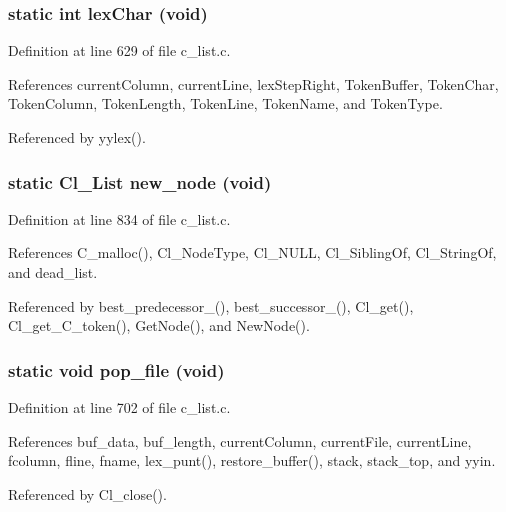 \subsubsection{\setlength{\rightskip}{0pt plus 5cm}static int lex\-Char (void)\hspace{0.3cm}{\tt  [static]}}\label{c__list_8c_a94f69d7dee0682c5956144d1c7322a6}




Definition at line 629 of file c\_\-list.c.

References current\-Column, current\-Line, lex\-Step\-Right, Token\-Buffer, Token\-Char, Token\-Column, Token\-Length, Token\-Line, Token\-Name, and Token\-Type.

Referenced by yylex().
\subsubsection{\setlength{\rightskip}{0pt plus 5cm}static \bf{Cl\_\-List} new\_\-node (void)\hspace{0.3cm}{\tt  [static]}}\label{c__list_8c_3e8aae697cdfa60db3cb9f1abf95b97e}




Definition at line 834 of file c\_\-list.c.

References C\_\-malloc(), Cl\_\-Node\-Type, Cl\_\-NULL, Cl\_\-Sibling\-Of, Cl\_\-String\-Of, and dead\_\-list.

Referenced by best\_\-predecessor\_(), best\_\-successor\_(), Cl\_\-get(), Cl\_\-get\_\-C\_\-token(), Get\-Node(), and New\-Node().
\subsubsection{\setlength{\rightskip}{0pt plus 5cm}static void pop\_\-file (void)\hspace{0.3cm}{\tt  [static]}}\label{c__list_8c_87c084fc0fc6247d122206a6f963a66f}




Definition at line 702 of file c\_\-list.c.

References buf\_\-data, buf\_\-length, current\-Column, current\-File, current\-Line, fcolumn, fline, fname, lex\_\-punt(), restore\_\-buffer(), stack, stack\_\-top, and yyin.

Referenced by Cl\_\-close().
